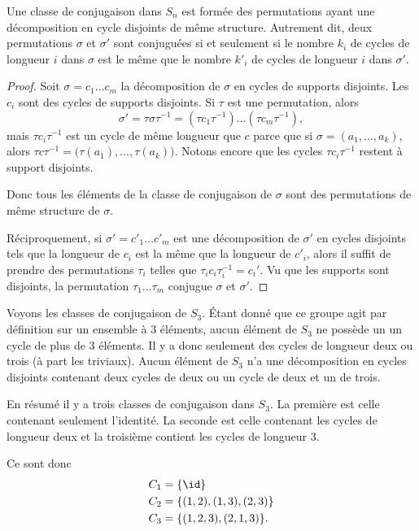 \begin{proposition} \label{PropEAHWXwe}
    Une classe de conjugaison dans \( S_n\) est formée des permutations ayant une décomposition en cycle disjoints de même structure. Autrement dit, deux permutations \( \sigma\) et \( \sigma'\) sont conjuguées si et seulement si le nombre \( k_i\) de cycles de longueur \( i\) dans \( \sigma\) est le même que le nombre \( k'_i\) de cycles de longueur \( i\) dans \( \sigma'\).
\end{proposition}

\begin{proof}
    Soit \( \sigma=c_1\ldots c_m\) la décomposition de \( \sigma\) en cycles de supports disjoints. Les \( c_i\) sont des cycles de supports disjoints. Si \( \tau\) est une permutation, alors
    \begin{equation}
        \sigma'=\tau\sigma\tau^{-1}=(\tau c_1\tau^{-1})\ldots (\tau c_m\tau^{-1}),
    \end{equation}
    mais \( \tau c_i\tau^{-1}\) est un cycle de même longueur que \( c\) parce que si \( \sigma=(a_1,\ldots, a_k)\), alors \( \tau c\tau^{-1}=\big( \tau(a_1),\ldots, \tau(a_k) \big)\). Notons encore que les cycles \( \tau c_i\tau^{-1}\) restent à support disjoints.

    Donc tous les éléments de la classe de conjugaison de \( \sigma\) sont des permutations de même structure de \( \sigma\).

    Réciproquement, si \( \sigma'=c'_1\ldots c'_m\) est une décomposition de \( \sigma'\) en cycles disjoints tels que la longueur de \( c_i\) est la même que la longueur de \( c'_i\), alors il suffit de prendre des permutations \( \tau_i\) telles que \( \tau_i c_i\tau_i^{-1}=c_i'\). Vu que les supports sont disjoints, la permutation \( \tau_1\ldots \tau_m\) conjugue \( \sigma\) et \( \sigma'\).
\end{proof}

\begin{example}
    Voyons les classes de conjugaison de \( S_3\). Étant donné que ce groupe agit par définition sur un ensemble à \( 3\) éléments, aucun élément de \( S_3\) ne possède un un cycle de plus de \( 3\) éléments. Il y a donc seulement des cycles de longueur deux ou trois (à part les triviaux). Aucun élément de \( S_3\) n'a une décomposition en cycles disjoints contenant deux cycles de deux ou un cycle de deux et un de trois.

    En résumé il y a trois classes de conjugaison dans \( S_3\). La première est celle contenant seulement l'identité. La seconde est celle contenant les cycles de longueur deux et la troisième contient les cycles de longueur \( 3\).

    Ce sont donc
    \begin{subequations}
        \begin{align}
            C_1&=\{ \id \}\\
            C_2&=\{ (1,2),(1,3),(2,3) \}\\
            C_3&=\{ (1,2,3),(2,1,3) \}.
        \end{align}
    \end{subequations}
\end{example}

